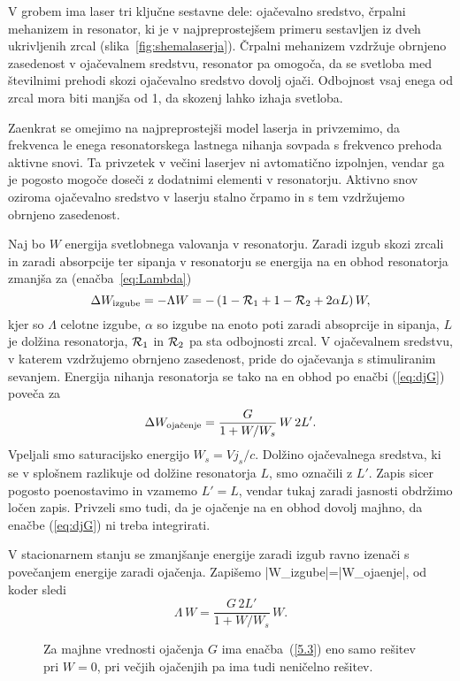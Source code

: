 V grobem ima laser tri ključne sestavne dele: ojačevalno sredstvo, 
črpalni mehanizem in resonator, ki je v najpreprostejšem primeru sestavljen iz dveh 
ukrivljenih zrcal (slika~\ref{fig:shemalaserja}). Črpalni 
mehanizem vzdržuje obrnjeno zasedenost v ojačevalnem sredstvu, resonator pa omogoča,
da se svetloba med številnimi prehodi skozi ojačevalno sredstvo dovolj ojači.
Odbojnost vsaj enega od zrcal 
mora biti manjša od 1, da skozenj lahko izhaja svetloba.

Zaenkrat se omejimo na najpreprostejši model laserja in 
privzemimo, da frekvenca le enega resonatorskega lastnega nihanja sovpada s 
frekvenco prehoda aktivne snovi. Ta privzetek v večini laserjev ni
avtomatično izpolnjen, vendar ga je pogosto mogoče doseči z dodatnimi elementi 
v resonatorju. Aktivno snov oziroma ojačevalno sredstvo v laserju stalno 
črpamo in s tem vzdržujemo obrnjeno zasedenost. 

Naj bo $W$ energija svetlobnega valovanja v resonatorju. Zaradi izgub skozi
zrcali in zaradi absorpcije ter sipanja v resonatorju se energija na en obhod 
resonatorja zmanjša za (enačba~\ref{eq:Lambda})
\begin{equation}
\Delta W_{\rm izgube}=-\Lambda W=-\left(1-{\cal {R}}_{1}+1-{\cal {R}}_{2}
+2\alpha L\right)W,
\label{5.1}
\end{equation}
kjer so $\Lambda $ celotne izgube, $\alpha$ so izgube na enoto poti zaradi
absoprcije in sipanja, $L$ je dolžina resonatorja, 
${\cal {R}}_{1}$ in ${\cal {R}}_{2}$ pa sta odbojnosti
zrcal. V ojačevalnem sredstvu, v katerem vzdržujemo obrnjeno zasedenost,
pride do ojačevanja s stimuliranim sevanjem. Energija nihanja resonatorja 
se tako na en obhod po enačbi (\ref{eq:djG}) poveča za 
\begin{equation}  
\Delta W_{\rm oja\check{c}enje}=\frac{G}{1+W/W_s}\,W\, 2L'.
\label{5.2}
\end{equation}
Vpeljali smo saturacijsko energijo $W_s=Vj_s/c$. Dolžino ojačevalnega sredstva,
ki se v splošnem razlikuje od dolžine resonatorja $L$, smo označili z $L'$.
Zapis sicer pogosto poenostavimo in vzamemo $L'=L$, vendar tukaj zaradi
jasnosti obdržimo ločen zapis. Privzeli smo tudi, da je ojačenje na en
obhod dovolj majhno, da enačbe (\ref{eq:djG}) ni treba integrirati.

V stacionarnem stanju se zmanjšanje energije zaradi izgub ravno izenači 
s povečanjem energije zaradi ojačenja. Zapišemo
\beq
|\Delta W_{\rm izgube}|=|\Delta W_{\rm ojaenje}|,
\eeq
od koder sledi
\begin{equation}  
\Lambda\, W=\frac{G\,2L'}{1+W/W_s}\,W.
\label{5.3}
\end{equation}
\begin{figure}[h]
\centering
\def\svgwidth{140truemm} 

\caption{Za majhne vrednosti ojačenja $G$ ima enačba~(\ref{5.3}) eno samo 
rešitev pri $W=0$, pri večjih ojačenjih pa ima tudi neničelno rešitev.}
\label{fig:stacio}
\end{figure}

